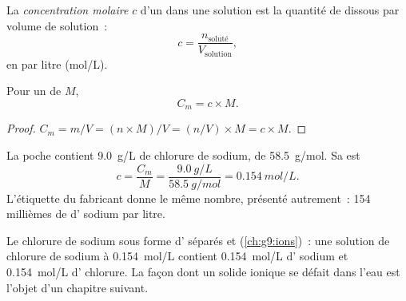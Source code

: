 \begin{definition}\label{def:g10:concentration-and-dilution:molar-concentration}
La \emph{concentration molaire} $c$ d'un
 dans une solution est la quantité de  dissous par volume de
solution~:
\[
  c = \frac{n_{\text{soluté}}}{V_{\text{solution}}},
\]
en  par litre (\si{mol/L}).
\end{definition}

\begin{proposition}\label{prop:g10:concentration-and-dilution:link}
Pour un  de  $M$,
\[
  C_m = c \times M .
\]
\end{proposition}

\begin{proof}
$C_m = m / V = (n \times M) / V = (n / V) \times M = c \times M$.
\end{proof}

\begin{example}\label{ex:g10:concentration-and-dilution:drip}
La poche contient \qty{9.0}{g/L} de chlorure de sodium, de 
\qty{58.5}{g/mol}. Sa  est
\[
  c = \frac{C_m}{M} = \frac{\qty{9.0}{g/L}}{\qty{58.5}{g/mol}}
    = \qty{0.154}{mol/L}.
\]
L'étiquette du fabricant donne le même nombre, présenté autrement~: 154
millièmes de  d' sodium par litre.
\end{example}

\begin{remark}\label{rem:g10:concentration-and-dilution:ions}
Le chlorure de sodium  sous forme d' séparés  et
 (\cref{ch:g9:ions})~: une solution de chlorure de sodium à
\qty{0.154}{mol/L} contient \qty{0.154}{mol/L} d' sodium et
\qty{0.154}{mol/L} d' chlorure. La façon dont un solide ionique se
défait dans l'eau est l'objet d'un chapitre suivant.
\end{remark}

